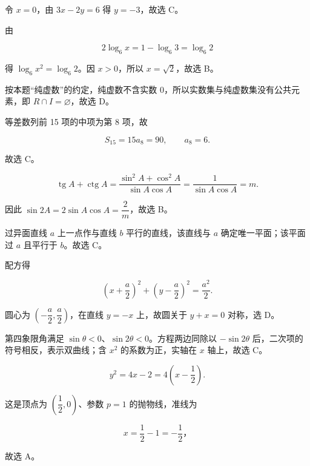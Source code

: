 \begin{answer}

令 $x=0$，由 $3x-2y=6$ 得 $y=-3$，故选 C。


由

\nopagebreak[4]
\[
2\log_6x=1-\log_6 3=\log_6 2
\]

得 $\log_6x^2=\log_6 2$。因 $x>0$，所以 $x=\sqrt2$，故选 B。


按本题“纯虚数”的约定，纯虚数不含实数 $0$，所以实数集与纯虚数集没有公共元素，即 $R\cap I=\varnothing$，故选 D。


等差数列前 15 项的中项为第 8 项，故

\nopagebreak[4]
\[
S_{15}=15a_8=90,
\qquad a_8=6.
\]

故选 C。


\nopagebreak[4]
\[
\operatorname{tg}A+\operatorname{ctg}A
=\frac{\sin^2A+\cos^2A}{\sin A\cos A}
=\frac1{\sin A\cos A}=m.
\]

因此 $\sin2A=2\sin A\cos A=\dfrac2m$，故选 B。


过异面直线 $a$ 上一点作与直线 $b$ 平行的直线，该直线与 $a$ 确定唯一平面；该平面过 $a$ 且平行于 $b$。故选 C。


配方得

\nopagebreak[4]
\[
\left(x+\frac a2\right)^2+\left(y-\frac a2\right)^2=\frac{a^2}{2}.
\]

圆心为 $\left(-\dfrac a2,\dfrac a2\right)$，在直线 $y=-x$ 上，故圆关于 $y+x=0$ 对称，选 D。


第四象限角满足 $\sin\theta<0$、$\sin2\theta<0$。方程两边同除以 $-\sin2\theta$ 后，二次项的符号相反，表示双曲线；含 $x^2$ 的系数为正，实轴在 $x$ 轴上，故选 C。


\nopagebreak[4]
\[
y^2=4x-2=4\left(x-\frac12\right).
\]

这是顶点为 $\left(\dfrac12,0\right)$、参数 $p=1$ 的抛物线，准线为

\nopagebreak[4]
\[
x=\frac12-1=-\frac12\text{，}
\]

故选 A。



\end{answer}
